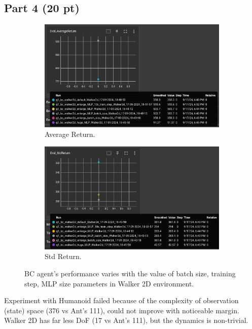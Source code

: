 \documentclass{article}
\begin{document}
\subsection{Part 4 (20 pt)}

\begin{figure}[!ht]
  \centering
  \begin{subfigure}[b]{.49\linewidth}
    \centering
    \includegraphics[width=\columnwidth]{figs/bc_walker2d_average_return.png}
    \caption{Average Return.}
  \end{subfigure}
  \begin{subfigure}[b]{.49\linewidth}
    \centering
    \includegraphics[width=\columnwidth]{figs/bc_walker2d_standard_return.png}
    \caption{Std Return.}
  \end{subfigure}
  \caption{BC agent's performance varies with the value of batch size, training step, MLP size parameters in Walker 2D environment.}
  \label{fig:p4}
\end{figure}

Experiment with Humanoid failed because of the complexity of observation (state) space (376 vs Ant's 111), could not improve with noticeable margin.
Walker 2D has far less DoF (17 vs Ant's 111), but the dynamics is non-trivial.
\end{document}

